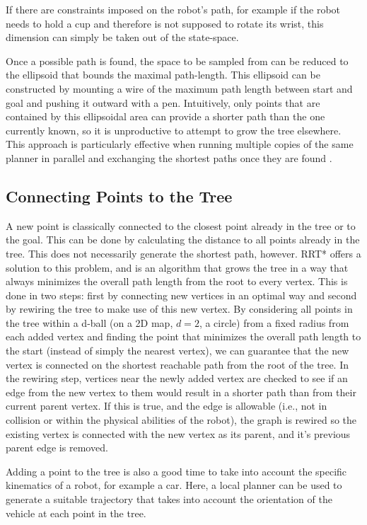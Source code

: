 If there are constraints imposed on the robot's path, for example if the robot needs to hold a cup and therefore is not supposed to rotate its wrist, this dimension can simply be taken out of the state-space.

Once a possible path is found, the space to be sampled from can be reduced to the ellipsoid that bounds the maximal path-length. This ellipsoid can be constructed by mounting a wire of the maximum path length between start and goal and pushing it outward with a pen. Intuitively, only points that are contained by this ellipsoidal area can provide a shorter path than the one currently known, so it is unproductive to attempt to grow the tree elsewhere. This approach is particularly effective when running multiple copies of the same planner in parallel and exchanging the shortest paths once they are found \cite{otte2012}.

\subsection{Connecting Points to the Tree}
A new point is classically connected to the closest point already in the tree or to the goal. This can be done by calculating the distance to all points already in the tree. This does not necessarily generate the shortest path, however. RRT* offers a solution to this problem, and is an algorithm that grows the tree in a way that always minimizes the overall path length from the root to every vertex. This is done in two steps: first by connecting new vertices in an optimal way and second by rewiring the tree to make use of this new vertex. By considering all points in the tree within a d-ball (on a 2D map, $d=2$, a circle) from a fixed radius from each added vertex and finding the point that minimizes the overall path length to the start (instead of simply the nearest vertex), we can guarantee that the new vertex is connected on the shortest reachable path from the root of the tree. In the rewiring step, vertices near the newly added vertex are checked to see if an edge from the new vertex to them would result in a shorter path than from their current parent vertex. If this is true, and the edge is allowable (i.e., not in collision or within the physical abilities of the robot), the graph is rewired so the existing vertex is connected with the new vertex as its parent, and it's previous parent edge is removed.

Adding a point to the tree is also a good time to take into account the specific kinematics of a robot, for example a car. Here, a local planner can be used to generate a suitable trajectory that takes into account the orientation of the vehicle at each point in the tree.

